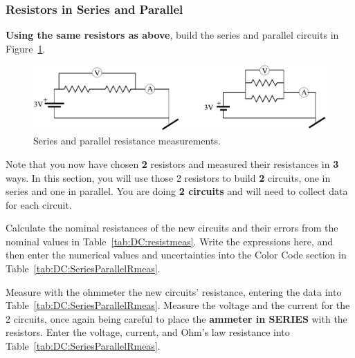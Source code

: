 \subsubsection{Resistors in Series and Parallel}

{\bf Using the same resistors as above}, build the series and 
parallel circuits in
Figure~\ref{fig:DC:procserpar}.  
\begin{figure}[htb]
\centering \epsfxsize=14cm \includegraphics[scale=0.7]{2_dc/procserpar.eps}
\caption{Series and parallel resistance measurements.}
\label{fig:DC:procserpar}
\end{figure}
Note that you now have 
chosen {\bf 2} resistors
and measured their resistances in {\bf 3} ways. In this section, you will
use those 2 resistors to build {\bf 2} circuits, one in series and one in
parallel.  You are doing {\bf 2 circuits} and will need to collect data 
for each circuit. 

\noindent
Calculate the nominal resistances of the new circuits and their errors from the nominal values in Table~\ref{tab:DC:resistmeas}. Write the expressions here, and then enter the numerical values and uncertainties into the Color Code section in Table~\ref{tab:DC:SeriesParallelRmeas}.\\
\vspace*{4cm}

\noindent Measure with the ohmmeter the new circuits' resistance, entering the data into
Table~\ref{tab:DC:SeriesParallelRmeas}. Measure the  voltage and the current
for the 2 circuits, once again being careful to place the {\bf ammeter
in SERIES} with the resistors.  Enter the voltage, current, and Ohm's law 
resistance into Table~\ref{tab:DC:SeriesParallelRmeas}. \\

